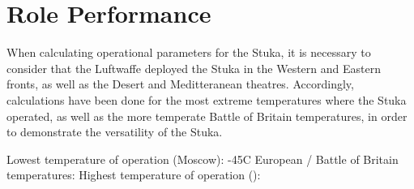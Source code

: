 \documentclass[a4paper, fontsize=11pt]{scrartcl} %
\begin{document}
\section{Role Performance}
When calculating operational parameters for the Stuka, it is necessary
to consider that the Luftwaffe deployed the Stuka in the Western and
Eastern fronts, as well as the Desert and Meditteranean theatres.
Accordingly, calculations have been done for the most extreme
temperatures where the Stuka operated, as well as the more temperate
Battle of Britain temperatures, in order to demonstrate the versatility
of the Stuka.

Lowest temperature of operation (Moscow): -45C \autocite{raus03}
European / Battle of Britain temperatures:
Highest temperature of operation ():


\printbibliography
\end{document}
